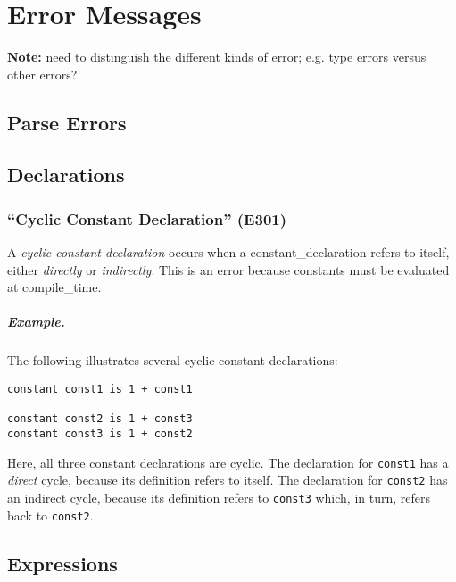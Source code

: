 \chapter{Error Messages}

{\bf Note:} need to distinguish the different kinds of error; e.g. type errors versus other errors?

\section{Parse Errors}

\section{Declarations}

\subsection{``Cyclic Constant Declaration'' (E301)}

A {\em cyclic constant declaration} occurs when a \gls{constant_declaration} refers to itself, either {\em directly} or {\em indirectly}.  This is an error because constants must be evaluated at \gls{compile_time}.

\paragraph{Example.}  The following illustrates several cyclic constant declarations:

\begin{lstlisting}
constant const1 is 1 + const1

constant const2 is 1 + const3
constant const3 is 1 + const2
\end{lstlisting}
Here, all three constant declarations are cyclic.  The declaration for \lstinline{const1} has a {\em direct} cycle, because its definition refers to itself.  The declaration for \lstinline{const2} has an indirect cycle, because its definition refers to \lstinline{const3} which, in turn, refers back to \lstinline{const2}.

\section{Expressions}


